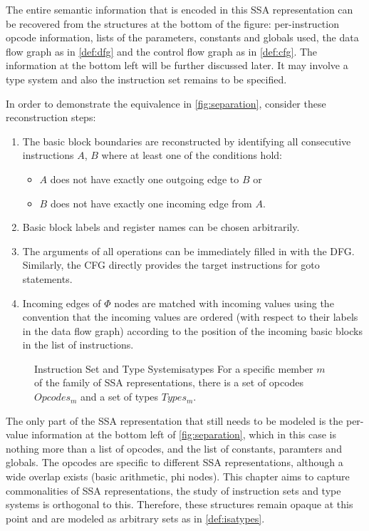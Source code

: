     The entire semantic information that is encoded in this SSA representation
    can be recovered from the structures at the bottom of the figure:
    per-instruction opcode information, lists of the parameters, constants and
    globals used, the data flow graph as in \autoref{def:dfg} and the control
    flow graph as in \autoref{def:cfg}.
    The information at the bottom left will be further discussed later.
    It may involve a type system and also the instruction set remains to be
    specified.

    In order to demonstrate the equivalence in \autoref{fig:separation},
    consider these reconstruction steps:
\begin{enumerate}
    \item The basic block boundaries are reconstructed by identifying all
          consecutive instructions $A$, $B$ where at least one of the
    conditions hold:
    \begin{itemize}
        \item $A$ does not have exactly one outgoing edge to $B$ or
        \item $B$ does not have exactly one incoming edge from $A$.
    \end{itemize}
    \item Basic block labels and register names can be chosen arbitrarily.
    \item The arguments of all operations can be immediately filled in with the 
          DFG. Similarly, the CFG directly provides the target instructions
          for goto statements.
    \item Incoming edges of $\Phi$ nodes are matched with incoming values using
          the convention that the incoming values are ordered (with respect to
          their labels in the data flow graph) according to the position of the
          incoming basic blocks in the list of instructions.
\end{enumerate}

\begin{figure}[b]
\begin{definition}{Instruction Set and Type System}{isatypes}
    For a specific member $m$ of the family of SSA representations, there is
    a set of opcodes $Opcodes_m$ and a set of types $Types_m$.
\end{definition}
\end{figure}

    The only part of the SSA representation that still needs to be modeled is
    the per-value information at the bottom left of \autoref{fig:separation},
    which in this case is nothing more than a list of opcodes, and the list of
    constants, paramters and globals.
    The opcodes are specific to different SSA representations, although a wide
    overlap exists (basic arithmetic, phi nodes).
    This chapter aims to capture commonalities of SSA representations, the study
    of instruction sets and type systems is orthogonal to this.
    Therefore, these structures remain opaque at this point and are modeled as
    arbitrary sets as in \autoref{def:isatypes}.

